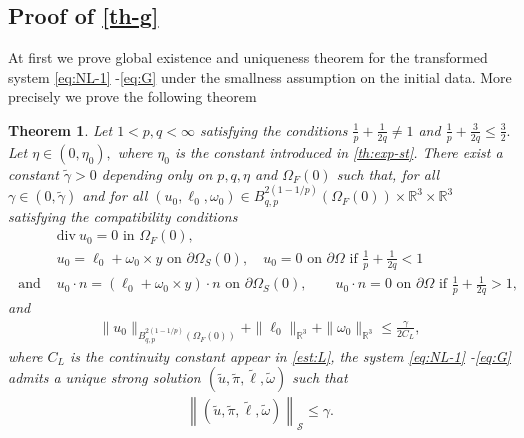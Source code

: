 \documentclass[12pt,a4paper,reqno]{amsart}
\newtheorem{theorem}{Theorem}[section]
\theoremstyle{definition}
\theoremstyle{remark}
\numberwithin{equation}{section}
\newcommand{\oso}{\Omega_{S}(0)}
\newcommand{\ofo}{\Omega_{F}(0)}
\newcommand{\rt}{\mathbb{R}^{3}}
\newcommand{\ds}{\displaystyle}
\newcommand{\poso}{\partial\oso}
\begin{document}
\subsection{Proof of  \cref{th-g}}
At first we prove global existence and uniqueness theorem for the transformed system \eqref{eq:NL-1} -\eqref{eq:G} under the smallness assumption on the initial data.  More precisely we prove the following theorem
\begin{theorem} \label{th-g-t}
Let $1 < p,q < \infty$ satisfying the conditions $\ds \frac{1}{p} + \frac{1}{2q} \neq 1$ and $\ds \frac{1}{p} + \frac{3}{2q} \leqslant \frac{3}{2}.$ Let $\eta \in (0,\eta_{0}),$ where $\eta_{0}$ is the constant introduced in \cref{th:exp-st}.
There exist a constant $\widetilde \gamma > 0$ depending only on $p,q, \eta$ and $\ofo$ such that,   for all  $\gamma \in (0,\widetilde \gamma)$ and for all   $(u_{0},\ell_{0},\omega_{0}) \in  B^{2(1-1/p)}_{q,p}(\ofo) \times \rt \times \rt$ satisfying the compatibility conditions
\begin{align*}
&\mathrm{div} \  u_{0} = 0 \mbox{ in } \ofo,  \\
& u_{0} = \ell_{0} + \omega_{0} \times y \mbox{ on } \poso, \quad u_{0} = 0 \mbox{ on } \partial\Omega \mbox{ if } \frac{1}{p} + \frac{1}{2q} < 1  \\
\mbox{ and } & u_{0} \cdot n = (\ell_{0} + \omega_{0} \times y) \cdot n \mbox{ on } \poso, \quad \quad u_{0} \cdot n = 0 \mbox{ on } \partial \Omega \mbox{ if } \frac{1}{p} + \frac{1}{2q} > 1,
\end{align*}
and
\begin{align} \label{eq:ini-ball}
\|u_{0}\|_{B^{2(1-1/p)}_{q,p}(\ofo)} + \|\ell_{0}\|_{\rt} + \|\omega_{0}\|_{\rt} \leqslant \frac{\gamma}{2C_{L}},
\end{align}
where $C_{L}$ is the continuity constant appear in \eqref{est:L},
the system \eqref{eq:NL-1} -\eqref{eq:G} admits a unique strong solution $(\widetilde u, \widetilde \pi,\widetilde\ell, \widetilde\omega)$ such that
\begin{align}
\left\|(\widetilde u,\widetilde \pi,\widetilde \ell,\widetilde \omega)  \right\|_{\mathcal{S}} \leqslant \gamma.
\end{align}
\end{theorem}
\end{document}
